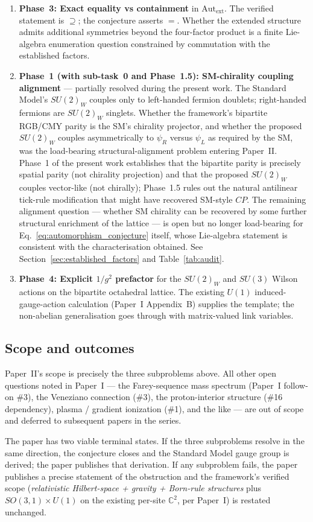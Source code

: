\begin{enumerate}
\item \textbf{Phase~3: Exact equality vs containment} in
$\mathrm{Aut}_\text{ext}$.  The verified statement is
$\supseteq$; the conjecture asserts $=$.  Whether the extended
structure admits additional symmetries beyond the four-factor
product is a finite Lie-algebra enumeration question constrained by
commutation with the established factors.

\item \textbf{Phase~1 (with sub-task~0 and Phase~1.5): SM-chirality
coupling alignment} --- partially resolved during the present work.  The Standard Model's $SU(2)_W$
couples only to left-handed fermion doublets; right-handed fermions
are $SU(2)_W$ singlets.  Whether the framework's bipartite RGB/CMY
parity is the SM's chirality projector, and whether the proposed
$SU(2)_W$ couples asymmetrically to $\psi_R$ versus $\psi_L$ as
required by the SM, was the load-bearing structural-alignment
problem entering Paper~II.  Phase~1 of the present work establishes
that the bipartite parity is precisely spatial parity (not chirality
projection) and that the proposed $SU(2)_W$ couples vector-like
(not chirally); Phase~1.5 rules out the natural antilinear
tick-rule modification that might have recovered SM-style $CP$.
The remaining alignment question --- whether SM chirality can be
recovered by some further structural enrichment of the lattice ---
is open but no longer load-bearing for Eq.~\eqref{eq:automorphism_conjecture}
itself, whose Lie-algebra statement is consistent with the
characterisation obtained.  See Section~\ref{sec:established_factors}
and Table~\ref{tab:audit}.

\item \textbf{Phase~4: Explicit $1/g^2$ prefactor} for the
$SU(2)_W$ and $SU(3)$ Wilson actions on the bipartite octahedral
lattice.  The existing $U(1)$ induced-gauge-action calculation
(Paper~I Appendix~B) supplies the template; the non-abelian
generalisation goes through with matrix-valued link variables.
\end{enumerate}

\subsection{Scope and outcomes}
\label{subsec:scope}

Paper~II's scope is precisely the three subproblems above.  All
other open questions noted in Paper~I --- the Farey-sequence mass
spectrum (Paper~I follow-on \#3), the Veneziano connection
(\#3), the proton-interior structure (\#16 dependency), plasma /
gradient ionization (\#1), and the like --- are out of scope and
deferred to subsequent papers in the series.

The paper has two viable terminal states.  If the three
subproblems resolve in the same direction, the conjecture closes and
the Standard Model gauge group is derived; the paper publishes that
derivation.  If any subproblem fails, the paper publishes a precise
statement of the obstruction and the framework's verified scope
(\emph{relativistic Hilbert-space + gravity + Born-rule structures}
plus $SO(3,1) \times U(1)$ on the existing per-site $\mathbb{C}^2$,
per Paper~I) is restated unchanged.
